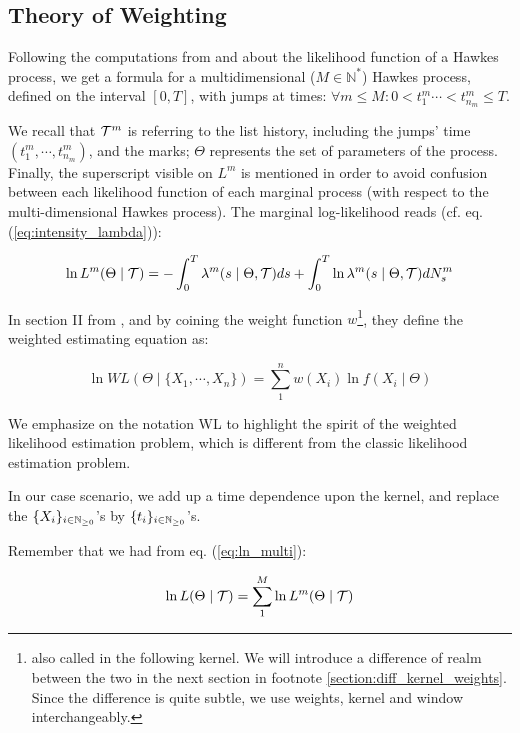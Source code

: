 \documentclass[11pt]{book}
\newcommand{\sequence}[1]{\{ #1 \}_{ i \in \N} }
\begin{document}
\subsection{Theory of Weighting}
Following the computations from \cite{Ozaki} and \cite{Likelihood_Hawkes} about the likelihood function of a Hawkes process, we get a formula for a multidimensional ($ M \in \mathbb N^*$) Hawkes process, defined on the interval $[0,T]$, with jumps at times: $ \forall m \leq M: 0 < t_{1}^m \cdots < t_{n_m}^m \leq T $.

We recall that $ \mathcal{T}^m $ is referring to the list history, including the jumps' time $( t_{1}^m, \cdots , t_{n_m}^m ) $, and the marks; $\Theta$ represents the set of parameters of the process. Finally, the superscript visible on $L^m$ is mentioned in order to avoid confusion between each likelihood function of each marginal process (with respect to the multi-dimensional Hawkes process). The marginal log-likelihood reads (cf. eq. (\ref{eq:intensity_lambda})):


\begin{equation}
\ln L^m( \Theta \mid \mathcal{T} ) = - \int_0^T \lambda^{m} ( s \mid \Theta , \mathcal{T} ) ds + \int_0^T \ln \lambda^{m}( s \mid \Theta , \mathcal{T} ) d N_s^m \label{eq:log_likelihood}
\end{equation}



In section II from \cite{weighted_likelihood}, and by coining the weight function $w$\footnote{also called in the following kernel. We will introduce a difference of realm between the two in the next section in footnote \ref{section:diff_kernel_weights}. Since the difference is quite subtle, we use weights, kernel and window interchangeably.}, they define the weighted estimating equation as:

\begin{equation}
\ln W L ( \Theta \mid \{ X_1, \cdots, X_n \} ) = \sum_1^n  w(X_i) \ln f( X_i \mid \Theta ) 
\end{equation}

We emphasize on the notation WL to highlight the spirit of the weighted likelihood estimation problem, which is different from the classic likelihood estimation problem.


In our case scenario, we add up a time dependence upon the kernel, and replace the $\sequence{X_i}$'s by $\sequence{t_i}$'s.


Remember that we had from eq. (\ref{eq:ln_multi}):
 
\begin{equation}
\ln L( \Theta \mid \mathcal{T} ) = \sum_1^M \ln L^m( \Theta \mid \mathcal{T} )
\end{equation}
\end{document}
